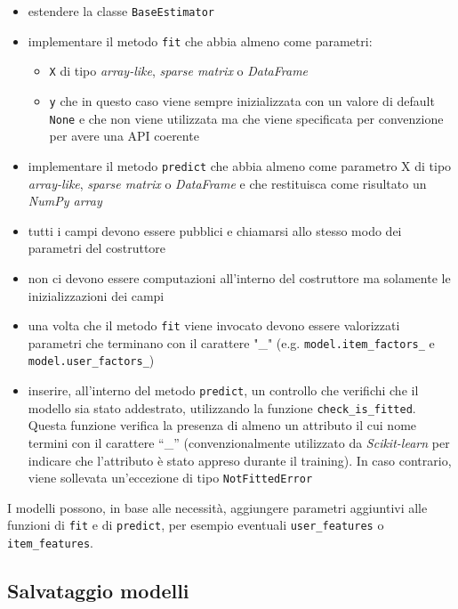 \begin{itemize}
    \item estendere la classe \texttt{BaseEstimator}
    \item implementare il metodo \texttt{fit} che abbia almeno come parametri:
    \begin{itemize}
        \item \texttt{X} di tipo \textit{array-like}, \textit{sparse matrix} o \textit{DataFrame}
        \item \texttt{y} che in questo caso viene sempre inizializzata con un valore di default \texttt{None} e che non viene utilizzata ma che viene specificata per convenzione per avere una API coerente
    \end{itemize}
    \item implementare il metodo \texttt{predict} che abbia almeno come parametro X di tipo \textit{array-like}, \textit{sparse matrix} o \textit{DataFrame} e che restituisca come risultato un \textit{NumPy array}
    \item tutti i campi devono essere pubblici e chiamarsi allo stesso modo dei parametri del costruttore
    \item non ci devono essere computazioni all'interno del costruttore ma solamente le inizializzazioni dei campi
    \item una volta che il metodo \texttt{fit} viene invocato devono essere valorizzati parametri che terminano con il carattere "\_" (e.g. \texttt{model.item\_factors\_} e \\ \texttt{model.user\_factors\_})
    \item inserire, all'interno del metodo \texttt{predict}, un controllo che verifichi che il modello sia stato addestrato, utilizzando la funzione \texttt{check\_is\_fitted}. Questa funzione verifica la presenza di almeno un attributo il cui nome termini con il carattere ``\_'' (convenzionalmente utilizzato da \textit{Scikit-learn} per indicare che l'attributo è stato appreso durante il training). In caso contrario, viene sollevata un'eccezione di tipo \texttt{NotFittedError}
\end{itemize}

I modelli possono, in base alle necessità, aggiungere parametri aggiuntivi alle funzioni di \texttt{fit} e di \texttt{predict}, per esempio eventuali \texttt{user\_features} o \texttt{item\_features}.

\subsection{Salvataggio modelli}

